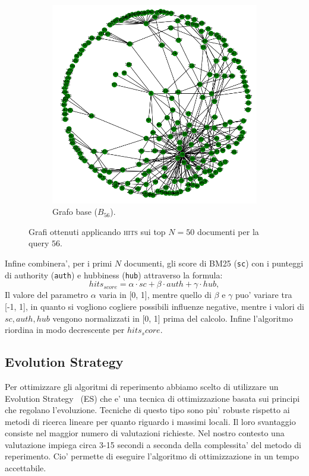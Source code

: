 \begin{figure}
\begin{subfigure}{.5\textwidth}
		\includegraphics[width=1\textwidth]{figures/B.png}
		\caption{Grafo base ($B_{56}$).}
		\label{fig:due}
	\end{subfigure}
	\caption{Grafi ottenuti applicando \textsc{hits} sui top $N=50$ documenti per la query $56$.}
	\label{fig:unodue}
\end{figure}

Infine combinera', per i primi $N$ documenti, gli score di BM25 (\texttt{sc}) con i punteggi di authority (\texttt{auth}) e hubbiness (\texttt{hub}) attraverso la formula:
\[ hits_{score} =  \alpha \cdot sc + \beta \cdot auth + \gamma \cdot hub,\]
Il valore del parametro $\alpha$ varia in [0, 1],  mentre quello di $\beta$ e $\gamma$ puo' variare tra [-1, 1], in quanto si vogliono cogliere possibili influenze negative, mentre i valori di $sc, auth, hub$ vengono normalizzati in [0, 1] prima del calcolo. 
Infine l'algoritmo riordina in modo decrescente per $hits_score$.


\subsection{Evolution Strategy}
\label{sec:es}

Per ottimizzare gli algoritmi di reperimento abbiamo scelto di utilizzare un Evolution Strategy~\cite{back1996evolutionary} (ES) che e' una tecnica di ottimizzazione basata sui principi che regolano l'evoluzione. Tecniche di questo tipo sono piu' robuste rispetto ai metodi di ricerca lineare per quanto riguardo i massimi locali. Il loro svantaggio consiste nel maggior numero di valutazioni richieste. Nel nostro contesto una valutazione impiega circa 3-15 secondi a seconda della complessita' del metodo di reperimento. Cio' permette di eseguire l'algoritmo di ottimizzazione in un tempo accettabile.

